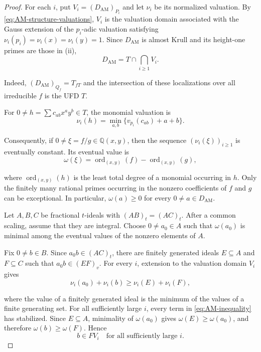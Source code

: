 \documentclass[11pt]{amsart}
\theoremstyle{definition}
\theoremstyle{remark}
\begin{document}
\begin{proof}
For each $i$, put $V_i=(D_{\mathrm{AM}})_{P_i}$ and let $\nu_i$ be its
normalized valuation.  By \eqref{eq:AM-structure-valuations}, $V_i$ is
the valuation domain associated with the Gauss extension of the $p_i$-adic
valuation satisfying $\nu_i(p_i)=\nu_i(x)=\nu_i(y)=1$.  Since $D_{\mathrm{AM}}$ is almost Krull
and its height-one primes are those in (ii),
\begin{equation}\label{eq:AM-intersection}
 D_{\mathrm{AM}}=T\cap\bigcap_{i\geq1}V_i.
\end{equation}

Indeed, $(D_{\mathrm{AM}})_{Q_f}=T_{fT}$ and the intersection of these
localizations over all irreducible $f$ is the UFD $T$.

For $0\ne h=\sum c_{ab}x^ay^b\in T$, the monomial valuation is
\begin{equation}\label{eq:AM-valuation}
 \nu_i(h)=\min_{a,b}\{v_{p_i}(c_{ab})+a+b\}.
\end{equation}

Consequently, if $0\ne\xi=f/g\in\mathbb Q(x,y)$, then the sequence
$(\nu_i(\xi))_{i\geq1}$ is eventually constant.  Its eventual value is
\begin{equation}\label{eq:AM-omega}
 \omega(\xi)=\operatorname{ord}_{(x,y)}(f)
             -\operatorname{ord}_{(x,y)}(g),
\end{equation}

where $\operatorname{ord}_{(x,y)}(h)$ is the least total degree of a monomial
occurring in $h$.  Only the finitely many rational primes occurring in the
nonzero coefficients of $f$ and $g$ can be exceptional.  In particular,
$\omega(a)\geq0$ for every $0\ne a\in D_{\mathrm{AM}}$.

Let $A,B,C$ be fractional $t$-ideals with $(AB)_t=(AC)_t$.  After a common
scaling, assume that they are integral.  Choose $0\ne a_0\in A$ such that
$\omega(a_0)$ is minimal among the eventual values of the nonzero elements
of $A$.

Fix $0\ne b\in B$.  Since $a_0b\in(AC)_t$, there are finitely generated
ideals $E\subseteq A$ and $F\subseteq C$ such that
$a_0b\in(EF)_v$.  For every $i$, extension to the valuation domain $V_i$
gives
\begin{equation}\label{eq:AM-inequality}
 \nu_i(a_0)+\nu_i(b)\geq \nu_i(E)+\nu_i(F),
\end{equation}

where the value of a finitely generated ideal is the minimum of the values
of a finite generating set.  For all sufficiently large $i$, every term in
\eqref{eq:AM-inequality} has stabilized.  Since $E\subseteq A$, minimality
of $\omega(a_0)$ gives $\omega(E)\geq\omega(a_0)$, and therefore
$\omega(b)\geq\omega(F)$.  Hence
\begin{equation}\label{eq:AM-eventual}
 b\in FV_i\quad\text{for all sufficiently large }i.
\end{equation}


\end{proof}
\end{document}
